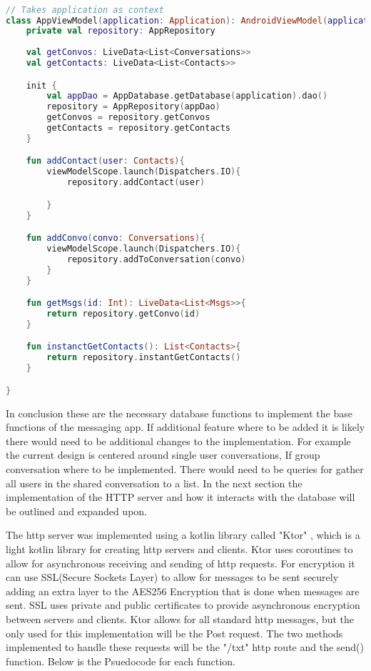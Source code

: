 \documentclass[../main/main.tex]{subfiles}
\begin{document}
\begin{lstlisting}[caption={Example of Viewmodel definition.}, label={lst:example4}, language=Kotlin]

// Takes application as context
class AppViewModel(application: Application): AndroidViewModel(application) {
    private val repository: AppRepository
	
    val getConvos: LiveData<List<Conversations>>
    val getContacts: LiveData<List<Contacts>>

    init {
        val appDao = AppDatabase.getDatabase(application).dao()
        repository = AppRepository(appDao)
        getConvos = repository.getConvos
        getContacts = repository.getContacts
    }

    fun addContact(user: Contacts){
        viewModelScope.launch(Dispatchers.IO){
            repository.addContact(user)

        }
    }

    fun addConvo(convo: Conversations){
        viewModelScope.launch(Dispatchers.IO){
            repository.addToConversation(convo)
        }
    }

    fun getMsgs(id: Int): LiveData<List<Msgs>>{
        return repository.getConvo(id)
    }

    fun instanctGetContacts(): List<Contacts>{
        return repository.instantGetContacts()
    }

}
\end{lstlisting}

In conclusion these are the necessary database functions to implement the base functions of the messaging app. 
If additional feature where to be added it is likely there would need to be additional changes to the implementation. 
For example the current design is centered around single user conversations, If group conversation where to be implemented. There would need to be queries for gather all users in the shared conversation to a list. 
In the next section the implementation of the HTTP server and how it interacts with the database will be outlined and expanded upon. 


The http server was implemented using a kotlin library called "Ktor" \cite{KTOR}, which is a light kotlin library for creating http servers and clients. 
Ktor uses coroutines to allow for asynchronous receiving and sending of http requests. 
For encryption it can use SSL(Secure Sockets Layer) to allow for messages to be sent securely adding an extra layer to the AES256 Encryption that is done when messages are sent. 
SSL uses private and public certificates to provide asynchronous encryption between servers and clients. 
Ktor allows for all standard http messages, but the only used for this implementation will be the Post request. 
The two methods implemented to handle these requests will be the "/txt" http route and the send() function.
Below is the Psuedocode for each function.
\end{document}
